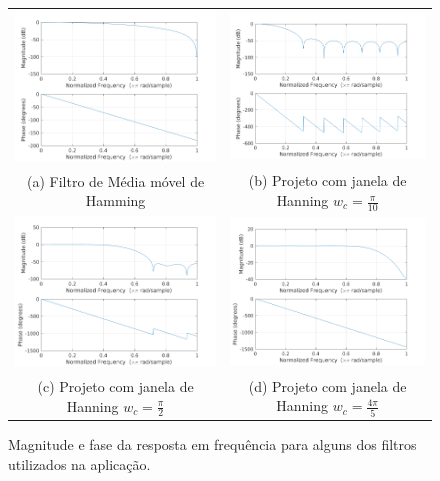 \begin{figure}[!hbt]
\centering
\begin{tabular}{cc}
\includegraphics[width=0.45\linewidth]{figs/filter-response-hanningFilter.png} &
\includegraphics[width=0.45\linewidth]{figs/filter-response-wc_0_1pi.png}\\
(a) Filtro de Média móvel de Hamming & (b) Projeto com janela de Hanning $w_c=\frac{\pi}{10}$ \\
\includegraphics[width=0.45\linewidth]{figs/filter-response-wc_0_5pi.png} &
\includegraphics[width=0.45\linewidth]{figs/filter-response-wc_0_8pi.png} \\
(c) Projeto com janela de Hanning $w_c=\frac{\pi}{2}$ & (d) Projeto com janela de Hanning $w_c=\frac{4\pi}{5}$ \\
\end{tabular}

\caption{Magnitude e fase da resposta em frequência para alguns dos filtros
utilizados na aplicação.}

\label{fig:filter-design-frequency-response}
\end{figure}

